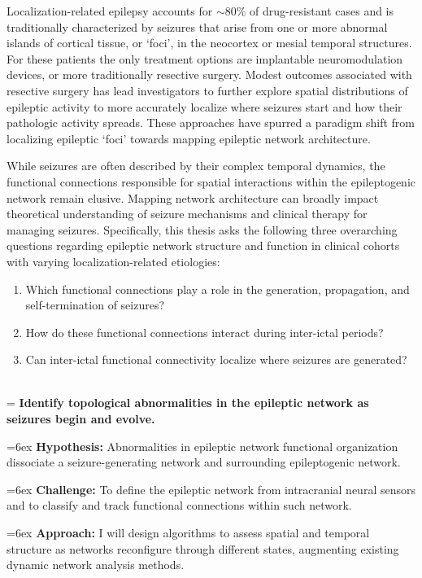 Localization-related epilepsy accounts for $\sim$80\% of drug-resistant cases and is traditionally characterized by seizures that arise from one or more abnormal islands of cortical tissue, or `foci', in the neocortex or mesial temporal structures. For these patients the only treatment options are implantable neuromodulation devices, or more traditionally resective surgery. Modest outcomes associated with resective surgery has lead investigators to further explore spatial distributions of epileptic activity to more accurately localize where seizures start and how their pathologic activity spreads. These approaches have spurred a paradigm shift from localizing epileptic ‘foci’ towards mapping epileptic network architecture.

While seizures are often described by their complex temporal dynamics, the functional connections responsible for spatial interactions within the epileptogenic network remain elusive. Mapping network architecture can broadly impact theoretical understanding of seizure mechanisms and clinical therapy for managing seizures.
Specifically, this thesis asks the following three overarching questions regarding epileptic network structure and function in clinical cohorts with varying localization-related etiologies:
\begin{enumerate}[topsep=1ex, itemsep=0pt]
    \item Which functional connections play a role in the generation, propagation, and self-termination of seizures?
    \item How do these functional connections interact during inter-ictal periods?
    \item Can inter-ictal functional connectivity localize where seizures are generated?
\end{enumerate}

~\\
\hangindent=\parindent
{}
\noindent
{} \textbf{Identify topological abnormalities in the epileptic network as seizures begin and evolve.}

\hangindent=6ex
\textbf{Hypothesis:} Abnormalities in epileptic network functional organization dissociate a seizure-generating network and surrounding epileptogenic network.

\hangindent=6ex
\textbf{Challenge:} To define the epileptic network from intracranial neural sensors and to classify and track functional connections within such network.

\hangindent=6ex
\textbf{Approach:} I will design algorithms to assess spatial and temporal structure as networks reconfigure through different states, augmenting existing dynamic network analysis methods.

